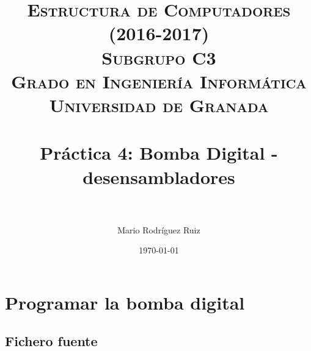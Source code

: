 


\title{	
\normalfont \normalsize 
\textsc{\textbf{Estructura de Computadores (2016-2017)} \\ Subgrupo C3 \\ Grado en Ingeniería Informática\\ Universidad de Granada} \\ [25pt] %
\horrule{0.5pt} \\[0.4cm] %
\huge Práctica 4: Bomba	Digital - desensambladores \\ %
\horrule{2pt} \\[0.5cm] %
}

\author{Mario Rodríguez Ruiz} %

\date{\normalsize\today} %




\maketitle %

\newpage %

\tableofcontents %

\listoffigures

\newpage


\section{Programar la bomba digital}
\subsection{Fichero fuente}
	
	
